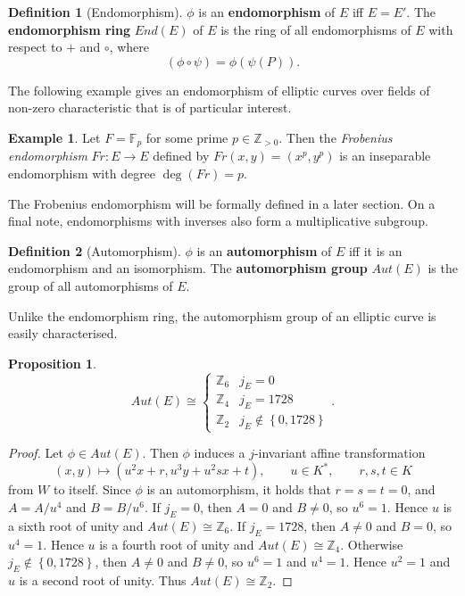 \documentclass{article}
\newcommand{\F}{\mathbb{F}}
\newcommand{\Z}{\mathbb{Z}}
\newcommand{\rb}[1]{\left( #1 \right)}
\newcommand{\cb}[1]{\left\{ #1 \right\}}
\theoremstyle{definition}\newtheorem*{definition}{Definition}
\theoremstyle{definition}\newtheorem*{example}{Example}
\theoremstyle{definition}\newtheorem*{remark}{Remark}
\newtheorem{proposition}{Proposition}[subsection]
\begin{document}
\begin{definition}[Endomorphism]
$ \phi $ is an \textbf{endomorphism} of $ E $ iff $ E = E' $. The \textbf{endomorphism ring} $ End\rb{E} $ of $ E $ is the ring of all endomorphisms of $ E $ with respect to $ + $ and $ \circ $, where
$$ \rb{\phi \circ \psi} = \phi\rb{\psi\rb{P}}. $$
\end{definition}

The following example gives an endomorphism of elliptic curves over fields of non-zero characteristic that is of particular interest.

\begin{example}
Let $ F = \F_p $ for some prime $ p \in \Z_{> 0} $. Then the \emph{Frobenius endomorphism} $ Fr : E \to E $ defined by $ Fr\rb{x, y} = \rb{x^p, y^p} $ is an inseparable endomorphism with degree $ \deg\rb{Fr} = p $.
\end{example}

The Frobenius endomorphism will be formally defined in a later section. On a final note, endomorphisms with inverses also form a multiplicative subgroup.

\begin{definition}[Automorphism]
$ \phi $ is an \textbf{automorphism} of $ E $ iff it is an endomorphism and an isomorphism. The \textbf{automorphism group} $ Aut\rb{E} $ is the group of all automorphisms of $ E $.
\end{definition}

Unlike the endomorphism ring, the automorphism group of an elliptic curve is easily characterised.

\begin{proposition}
$$ Aut\rb{E} \cong \begin{cases} \Z_6 & j_E = 0 \\ \Z_4 & j_E = 1728 \\ \Z_2 & j_E \notin \cb{0, 1728} \end{cases}. $$
\end{proposition}

\begin{proof}
Let $ \phi \in Aut\rb{E} $. Then $ \phi $ induces a $ j $-invariant affine transformation
$$ \rb{x, y} \mapsto \rb{u^2x + r, u^3y + u^2sx + t}, \qquad u \in K^*, \qquad r, s, t \in K $$
from $ W $ to itself. Since $ \phi $ is an automorphism, it holds that $ r = s = t = 0 $, and $ A = A / u^4 $ and $ B = B / u^6 $. If $ j_E = 0 $, then $ A = 0 $ and $ B \ne 0 $, so $ u^6 = 1 $. Hence $ u $ is a sixth root of unity and $  Aut\rb{E} \cong \Z_6 $. If $ j_E = 1728 $, then $ A \ne 0 $ and $ B = 0 $, so $ u^4 = 1 $. Hence $ u $ is a fourth root of unity and $ Aut\rb{E} \cong \Z_4 $. Otherwise $ j_E \notin \cb{0, 1728} $, then $ A \ne 0 $ and $ B \ne 0 $, so $ u^6 = 1 $ and $ u^4 = 1 $. Hence $ u^2 = 1 $ and $ u $ is a second root of unity. Thus $ Aut\rb{E} \cong \Z_2 $.
\end{proof}
\end{document}
